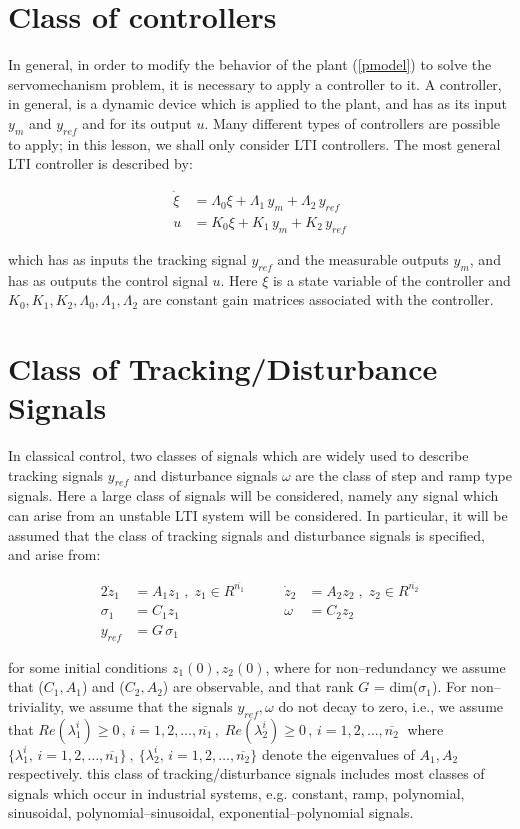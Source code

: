 \documentclass[a4paper]{article}
\theoremstyle{plain} %
{\theorembodyfont{\normalfont}
\newtheorem{Exa}{Example}}
\def\td{tracking/disturbance }
\begin{document}
\section{Class of controllers}
In general, in order to modify the behavior of the plant
(\ref{pmodel}) to solve the servomechanism problem, it is
necessary to apply a controller to it. A controller, in general,
is a dynamic device which is applied to the plant, and has as its
input $y_m$ and $y_{ref}$ and for its output $u$. Many different
types of controllers are possible to apply; in this lesson, we
shall only consider LTI controllers. The most general LTI
controller is described by:

\begin{align}\label{class-ctr}
 \dot{\xi} &= {\Lambda}_{0}\xi + {\Lambda}_1 \, y_m + {\Lambda}_2
 \, y_{ref} \\
 u &= K_0 \xi + K_1 \, y_m + K_2 \, y_{ref} \nonumber
\end{align}

which has as inputs the tracking signal $y_{ref}$ and the
measurable outputs $y_m$, and has as outputs the control signal
$u$. Here $\xi$ is a state variable of the controller and
$K_0,K_1,K_2,\Lambda_0,\Lambda_1,\Lambda_2$ are constant gain
matrices associated with the controller.

\section{Class of Tracking/Disturbance Signals}
In classical control, two classes of signals which are widely used
to describe tracking signals $y_{ref}$ and disturbance signals
$\omega$ are the class of step and ramp type signals. Here a large
class of signals will be considered, namely any signal which can
arise from an unstable LTI system will be considered. In
particular, it will be assumed that the class of tracking signals
and disturbance signals is specified, and arise from:

\begin{alignat}{2}\label{class-tds}
\dot{z}_1 &= A_1 z_1 \;,\; z_1 \in R^{\overline{n_1}} &\qquad %
\dot{z}_2 &= A_2 z_2 \;,\; z_2 \in R^{\overline{n_2}} \nonumber \\%
\sigma_1 &= C_1 z_1  &\qquad
\omega &= C_2 z_2 \\%
y_{ref} &= G \, \sigma_1 \nonumber %
\end{alignat}

for some initial conditions $z_1(0), z_2(0)$, where for
non--redundancy we assume that ($C_1, A_1$) and ($C_2, A_2$) are
observable, and that rank $G$ = dim($\sigma_1$). For
non--triviality, we assume that the signals $y_{ref}, \omega$ do
not decay to zero, i.e., we assume that $Re(\lambda_{1}^i)\geq 0 \,
, \,i=1,2,\ldots,\overline{n_1} \, , \; Re(\lambda_{2}^i)\geq 0 \,
, \, i=1,2,\ldots,\overline{n_2} \;$ where $\{ \lambda_{1}^i,\,
i=1,2,\ldots, \overline{n_1} \} \:,\: \{ \lambda_{2}^i,
\,i=1,2,\ldots, \overline{n_2} \}$ denote the eigenvalues of $A_1,
A_2$ respectively. this class of \td signals includes most classes
of signals which occur in industrial systems, e.g. constant, ramp,
polynomial, sinusoidal, polynomial--sinusoidal,
exponential--polynomial signals.\\
\end{document}
